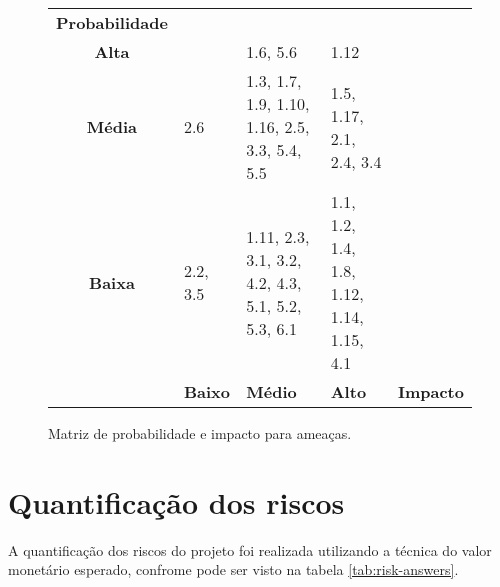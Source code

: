 \begin{figure}[h]
	\begin{tabularx}{\textwidth}{ c | >{\centering\arraybackslash}X >{\centering\arraybackslash}X >{\centering\arraybackslash}X l}
		\textbf{Probabilidade} &                                     &                                       &                                  &                  \\
		\cellcolor{red!30!}\textbf{Alta} &
		\cellcolor{yellow!10!} &
		\cellcolor{red!10!} 1.6, 5.6  &
		\cellcolor{red!10!} 1.12  &   \\
		\cellcolor{yellow!30!}\textbf{Média}&
		\cellcolor{green!10!} 2.6 &
		\cellcolor{yellow!10!} 1.3, 1.7, 1.9, 1.10, 1.16, 2.5, 3.3, 5.4, 5.5 &
		\cellcolor{red!10!} 1.5, 1.17, 2.1, 2.4, 3.4 &   \\
		\cellcolor{green!30!}\textbf{Baixa}&
		\cellcolor{green!10!} 2.2, 3.5 &
		\cellcolor{green!10!} 1.11, 2.3, 3.1, 3.2, 4.2, 4.3, 5.1, 5.2, 5.3, 6.1 &
		\cellcolor{yellow!10!} 1.1, 1.2, 1.4, 1.8, 1.12, 1.14, 1.15, 4.1 &   \\
		\hline
		                       & \cellcolor{green!30!}\textbf{Baixo} & \cellcolor{yellow!30!}\textbf{Médio} & \cellcolor{red!30!}\textbf{Alto} & \textbf{Impacto} \\
	\end{tabularx}
	\caption{Matriz de probabilidade e impacto para ameaças.}
	\label{fig:probability-impact-matrix-threats}
	\centering
\end{figure}

\section{Quantificação dos riscos}
\label{sec:risk-quantification}


A quantificação dos riscos do projeto foi realizada utilizando a técnica do valor monetário esperado, confrome pode ser visto na tabela \ref{tab:risk-answers}.


